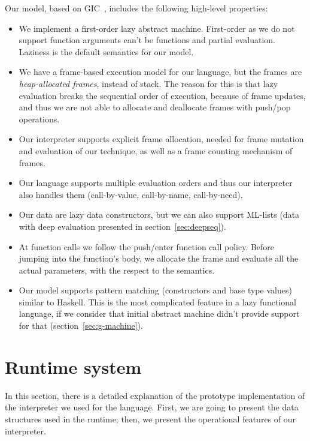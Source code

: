 \documentclass[diploma]{softlab-thesis}
\begin{document}
Our model, based on GIC~\cite{Fourtounis14}, 
includes the following high-level properties:
\begin{itemize}
  \item We implement a first-order lazy abstract machine. First-order as we do not support
  function arguments can't be functions and partial evaluation. Laziness is the default semantics
  for our model.
  \item We have a frame-based execution model for our language, but the frames are 
  \textit{heap-allocated frames}, instead of stack. The reason for this is that lazy evaluation 
  breaks the sequential order of execution, because of frame updates, and thus we are not able 
  to allocate and deallocate frames with push/pop operations.
  \item Our interpreter supports explicit frame allocation, needed for frame mutation and evaluation 
  of our technique, as well as a frame counting mechanism of frames.
  \item Our language supports multiple evaluation orders and thus our interpreter 
  also handles them (call-by-value, call-by-name, call-by-need).
  \item Our data are lazy data constructors, but we can also support ML-lists (data with deep evaluation
  presented in section~\ref{sec:deepseq}).
  \item At function calls we follow the push/enter function call policy. Before jumping into 
  the function's body, we allocate the frame and evaluate all the actual parameters, with the respect
  to the semantics. 
  \item Our model supports pattern matching (constructors and base type values) similar to Haskell. 
  This is the most complicated feature in a lazy functional language, if we consider that initial 
  abstract machine didn't provide support for that (section~\ref{sec:g-machine}).
\end{itemize}

\section {Runtime system}
\label{sec:runtime-system}

In this section, there is a detailed explanation of the prototype implementation of the interpreter we 
used for the language. First, we are going to present the data structures used in the runtime; then, 
we present the operational features of our interpreter. 
\end{document}
